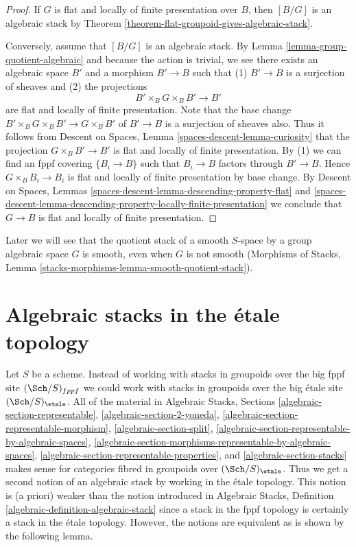 \begin{proof}
If $G$ is flat and locally of finite presentation over $B$, then
$[B/G]$ is an algebraic stack by
Theorem \ref{theorem-flat-groupoid-gives-algebraic-stack}.

\medskip\noindent
Conversely, assume that $[B/G]$ is an algebraic stack. By
Lemma \ref{lemma-group-quotient-algebraic}
and because the action is trivial, we see
there exists an algebraic space $B'$ and a morphism
$B' \to B$ such that (1) $B' \to B$ is a surjection
of sheaves and (2) the projections
$$
B' \times_B G \times_B B' \to B'
$$
are flat and locally of finite presentation. Note that the base change
$B' \times_B G \times_B B' \to G \times_B B'$ of $B' \to B$
is a surjection of sheaves also. Thus it follows from
Descent on Spaces, Lemma \ref{spaces-descent-lemma-curiosity}
that the projection $G \times_B B' \to B'$ is flat and locally
of finite presentation. By (1) we can find an fppf covering
$\{B_i \to B\}$ such that $B_i \to B$ factors through $B' \to B$.
Hence $G \times_B B_i \to B_i$ is flat and locally of finite presentation
by base change. By
Descent on Spaces, Lemmas
\ref{spaces-descent-lemma-descending-property-flat} and
\ref{spaces-descent-lemma-descending-property-locally-finite-presentation}
we conclude that $G \to B$ is flat and locally of finite presentation.
\end{proof}

\noindent
Later we will see that the quotient stack of a smooth $S$-space
by a group algebraic space $G$ is smooth, even when $G$ is not smooth
(Morphisms of Stacks, Lemma
\ref{stacks-morphisms-lemma-smooth-quotient-stack}).




\section{Algebraic stacks in the \'etale topology}
\label{section-stacks-etale}

\noindent
Let $S$ be a scheme. Instead of working with stacks in groupoids over
the big fppf site $(\Sch/S)_{fppf}$ we could work with stacks in groupoids
over the big \'etale site $(\Sch/S)_\etale$. All of the material in
Algebraic Stacks, Sections
\ref{algebraic-section-representable},
\ref{algebraic-section-2-yoneda},
\ref{algebraic-section-representable-morphism},
\ref{algebraic-section-split},
\ref{algebraic-section-representable-by-algebraic-spaces},
\ref{algebraic-section-morphisms-representable-by-algebraic-spaces},
\ref{algebraic-section-representable-properties}, and
\ref{algebraic-section-stacks}
makes sense for categories fibred in groupoids over $(\Sch/S)_\etale$.
Thus we get a second notion of an algebraic stack by working in the
\'etale topology. This notion is (a priori) weaker than the notion introduced
in Algebraic Stacks, Definition \ref{algebraic-definition-algebraic-stack}
since a stack in the fppf topology is certainly a stack in the \'etale
topology. However, the notions are equivalent as is shown by the following
lemma.

